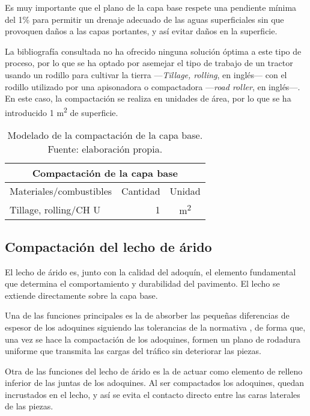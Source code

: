 Es muy importante que el plano de la capa base respete una pendiente mínima del 1\% para permitir un drenaje adecuado de las aguas superficiales sin que provoquen daños a las capas portantes, y así evitar daños en la superficie.

La bibliografía consultada no ha ofrecido ninguna solución óptima a este tipo de proceso, por lo que se ha optado por asemejar el tipo de trabajo de un tractor usando un rodillo para cultivar la tierra —\textit{Tillage, rolling}, en inglés— con el rodillo utilizado por una apisonadora o compactadora —\textit{road roller}, en inglés—. En este caso, la compactación se realiza en unidades de área, por lo que se ha introducido 1 \si{m^2} de superficie.

\begin{table}[!htb]
\centering
\begin{tabular}{p{8cm}rc}
\toprule
\multicolumn{3}{c}{Compactación de la capa base}\\
\midrule
Materiales/combustibles & Cantidad & Unidad\\
\midrule
Tillage, rolling/CH U & 1 & \si{m^2}\\
\bottomrule
\end{tabular}
\caption[Modelado de la compactación de la capa base.]{Modelado de la compactación de la capa base. Fuente: elaboración propia.}
\label{modeladocapabase}
\end{table}

\subsection{Compactación del lecho de árido}

El lecho de árido es, junto con la calidad del adoquín, el elemento fundamental que determina el comportamiento y durabilidad del pavimento. El lecho se extiende directamente sobre la capa base.

Una de las funciones principales es la de absorber las pequeñas diferencias de espesor de los adoquines siguiendo las tolerancias de la normativa \cite{une1338}, de forma que, una vez se hace la compactación de los adoquines, formen un plano de rodadura uniforme que transmita las cargas del tráfico sin deteriorar las piezas.

Otra de las funciones del lecho de árido es la de actuar como elemento de relleno inferior de las juntas de los adoquines. Al ser compactados los adoquines, quedan incrustados en el lecho, y así se evita el contacto directo entre las caras laterales de las piezas.


